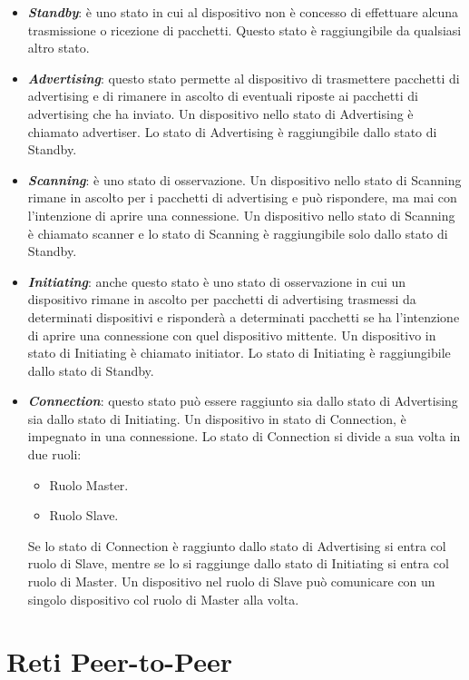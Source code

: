 \begin{itemize}
	\item \textit{\textbf{Standby}}: è uno stato in cui al dispositivo non è concesso di effettuare alcuna trasmissione o ricezione di pacchetti. Questo stato è raggiungibile da qualsiasi altro stato.
	\item \textbf{\textit{Advertising}}: questo stato permette al dispositivo di  trasmettere pacchetti di advertising e di rimanere in ascolto di eventuali riposte ai pacchetti di advertising che ha inviato. Un dispositivo nello stato di Advertising è chiamato advertiser. Lo stato di Advertising è raggiungibile dallo stato di Standby.
	\item \textbf{\textit{Scanning}}: è uno stato di osservazione. Un dispositivo nello stato di Scanning rimane in ascolto per i pacchetti di advertising e può rispondere, ma mai con l'intenzione di aprire una connessione. Un dispositivo nello stato di Scanning è chiamato scanner e lo stato di Scanning è raggiungibile solo dallo stato di Standby.
	\item \textbf{\textit{Initiating}}: anche questo stato è uno stato di osservazione in cui un dispositivo rimane in ascolto per pacchetti di advertising trasmessi da determinati dispositivi e risponderà a determinati pacchetti se ha l'intenzione di aprire una connessione con quel dispositivo mittente. Un dispositivo in stato di Initiating è chiamato initiator. Lo stato di Initiating è raggiungibile dallo stato di Standby.
	\item \textbf{\textit{Connection}}: questo stato può essere raggiunto sia dallo stato di Advertising sia dallo stato di Initiating. Un dispositivo in stato di Connection, è impegnato in una connessione. Lo stato di Connection si divide a sua volta in due ruoli:
	\begin{itemize}
		\item Ruolo Master.
		\item Ruolo Slave.
	\end{itemize}
	Se lo stato di Connection è raggiunto dallo stato di Advertising si entra col ruolo di Slave, mentre se lo si raggiunge dallo stato di Initiating si entra col ruolo di Master. Un dispositivo nel ruolo di Slave può comunicare con un singolo dispositivo col ruolo di Master alla volta.
\end{itemize}

\section{Reti Peer-to-Peer}
